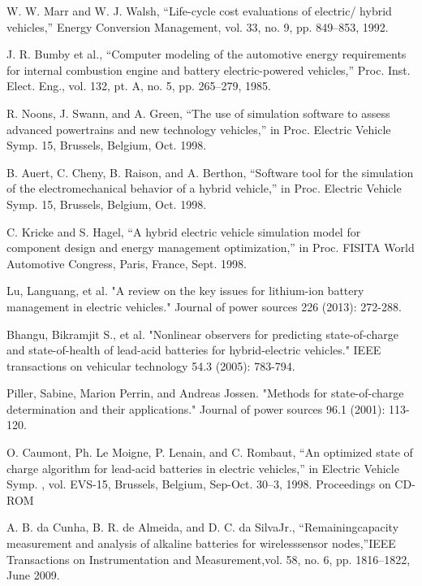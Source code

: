 
W. W. Marr and W. J. Walsh, “Life-cycle cost evaluations of electric/
hybrid vehicles,” Energy Conversion Management, vol. 33, no. 9,
pp. 849–853, 1992.

J. R. Bumby et al., “Computer modeling of the automotive energy requirements
for internal combustion engine and battery electric-powered
vehicles,” Proc. Inst. Elect. Eng., vol. 132, pt. A, no. 5, pp. 265–279,
1985.

R. Noons, J. Swann, and A. Green, “The use of simulation software
to assess advanced powertrains and new technology vehicles,” in Proc.
Electric Vehicle Symp. 15, Brussels, Belgium, Oct. 1998.

B. Auert, C. Cheny, B. Raison, and A. Berthon, “Software tool for the
simulation of the electromechanical behavior of a hybrid vehicle,” in
Proc. Electric Vehicle Symp. 15, Brussels, Belgium, Oct. 1998.

C. Kricke and S. Hagel, “A hybrid electric vehicle simulation model
for component design and energy management optimization,” in Proc.
FISITA World Automotive Congress, Paris, France, Sept. 1998.

Lu, Languang, et al. "A review on the key issues for lithium-ion battery management in electric vehicles." Journal of power sources 226 (2013): 272-288.

Bhangu, Bikramjit S., et al. "Nonlinear observers for predicting state-of-charge and state-of-health of lead-acid batteries for hybrid-electric vehicles." IEEE transactions on vehicular technology 54.3 (2005): 783-794.

Piller, Sabine, Marion Perrin, and Andreas Jossen. "Methods for state-of-charge determination and their applications." Journal of power sources 96.1 (2001): 113-120.

O. Caumont, Ph. Le Moigne, P. Lenain, and C. Rombaut, “An optimized
state of charge algorithm for lead-acid batteries in electric vehicles,” in
Electric Vehicle Symp. , vol. EVS-15, Brussels, Belgium, Sep-Oct. 30–3,
1998. Proceedings on CD-ROM

A. B. da Cunha, B. R. de Almeida, and D. C. da SilvaJr., “Remainingcapacity  measurement  and  analysis  of  alkaline  batteries  for  wirelesssensor nodes,”IEEE Transactions on Instrumentation and Measurement,vol. 58, no. 6, pp. 1816–1822, June 2009.


